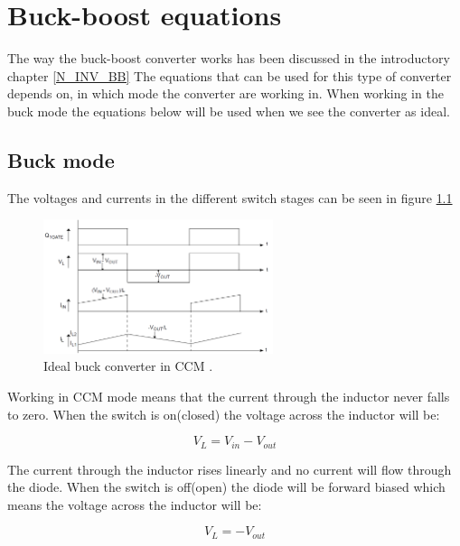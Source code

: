 \chapter{Buck-boost equations}\label{ch:Appbuckboost}

The way the buck-boost converter works has been discussed in the introductory chapter \ref{N_INV_BB} The equations that can be used for this type of converter depends on, in which mode the converter are working in. When working in the buck mode the equations below will be used when we see the converter as ideal. 

\section{Buck mode}

The voltages and currents in the different switch stages can be seen in figure \ref{CCM_buck}

\begin{figure}[htbp]
	\begin{center}
		\includegraphics[width=0.6\textwidth]{../Pictures/P1/Appendix/buck_currents}
		\caption{Ideal buck converter in CCM \cite{CCM_buck}.}
		\label{CCM_buck}
	\end{center}	
\end{figure}

Working in CCM mode means that the current through the inductor never falls to zero. When the switch is on(closed) the voltage across the inductor will be: 

\begin{equation}
V_L = V_{in}-V_{out}
\end{equation} 

The current through the inductor rises linearly and no current will flow through the diode.
When the switch is off(open) the diode will be forward biased which means the voltage across the inductor will be:

\begin{equation}
V_L = -V_{out}
\end{equation} 

